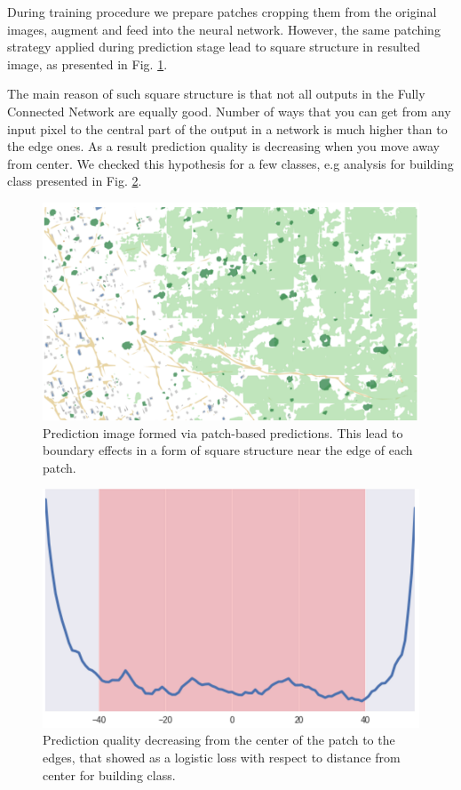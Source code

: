 \documentclass[10pt,twocolumn,letterpaper]{article}
\begin{document}
During training procedure we prepare patches cropping them from the original images, augment and feed into the neural network. However, the same patching strategy applied during prediction stage lead to square structure in resulted image, as presented in Fig. \ref{fig:boundarybad}. 

The main reason of such square structure is that not all outputs in the Fully Connected Network are equally good. Number of ways that you can get from any input pixel to the central part of the output in a network is much higher than to the edge ones. As a result prediction quality is decreasing when you move away from center. We checked this hypothesis for a few classes, e.g analysis for building class presented in Fig. \ref{fig:boundary}.

\begin{figure}[!h]
	\captionsetup{justification=centering}
	\centering
	\includegraphics[scale=0.2]{boundarybad}
	\caption{Prediction image formed via patch-based predictions. This lead to boundary effects in a form of square structure near the edge of each patch.}
	\label{fig:boundarybad}
\end{figure}

\begin{figure}[!h]
	\captionsetup{justification=centering}
	\centering
	\includegraphics[scale=0.25]{boundary3}
	\caption{Prediction quality decreasing from the center of the patch to the edges, that showed as a logistic loss with respect to distance from center for building class.}
	\label{fig:boundary}
\end{figure}
\end{document}

